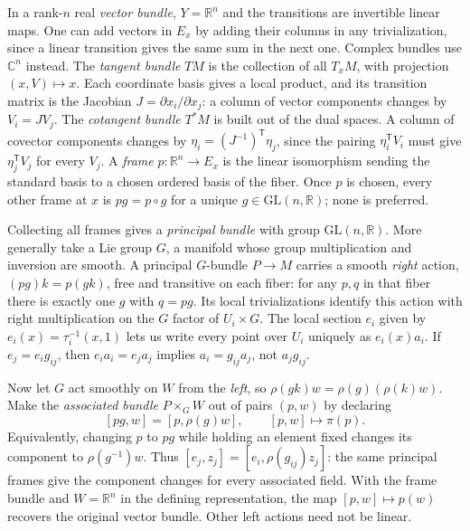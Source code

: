 In a rank-$n$ real \emph{vector bundle}, $Y=\mathbb R^n$ and the transitions are invertible linear maps. One can add vectors in $E_x$ by adding their columns in any trivialization, since a linear transition gives the same sum in the next one. Complex bundles use $\mathbb C^n$ instead. The \emph{tangent bundle} $TM$ is the collection of all $T_xM$, with projection $(x,V)\mapsto x$. Each coordinate basis gives a local product, and its transition matrix is the Jacobian $J=\partial x_i/\partial x_j$: a column of vector components changes by $V_i=J V_j$. The \emph{cotangent bundle} $T^*M$ is built out of the dual spaces. A column of covector components changes by $\eta_i=(J^{-1})^{\mathsf T}\eta_j$, since the pairing $\eta_i^{\mathsf T}V_i$ must give $\eta_j^{\mathsf T}V_j$ for every $V_j$. A \emph{frame} $p:\mathbb R^n\to E_x$ is the linear isomorphism sending the standard basis to a chosen ordered basis of the fiber. Once $p$ is chosen, every other frame at $x$ is $p g=p\circ g$ for a unique $g\in\mathrm{GL}(n,\mathbb R)$; none is preferred.

Collecting all frames gives a \emph{principal bundle} with group $\mathrm{GL}(n,\mathbb R)$. More generally take a Lie group $G$, a manifold whose group multiplication and inversion are smooth. A principal $G$-bundle $P\to M$ carries a smooth \emph{right} action, $(p g)k=p(gk)$, free and transitive on each fiber: for any $p,q$ in that fiber there is exactly one $g$ with $q=p g$. Its local trivializations identify this action with right multiplication on the $G$ factor of $U_i\times G$. The local section $e_i$ given by $e_i(x)=\tau_i^{-1}(x,1)$ lets us write every point over $U_i$ uniquely as $e_i(x)a_i$. If $e_j=e_i g_{ij}$, then $e_i a_i=e_j a_j$ implies $a_i=g_{ij}a_j$, not $a_j g_{ij}$.

Now let $G$ act smoothly on $W$ from the \emph{left}, so $\rho(gk)w=\rho(g)(\rho(k)w)$. Make the \emph{associated bundle} $P\times_G W$ out of pairs $(p,w)$ by declaring
\[
 [p g,w]=[p,\rho(g)w],\qquad [p,w]\longmapsto\pi(p) .
\]
Equivalently, changing $p$ to $p g$ while holding an element fixed changes its component to $\rho(g^{-1})w$. Thus $[e_j,z_j]=[e_i,\rho(g_{ij})z_j]$: the same principal frames give the component changes for every associated field. With the frame bundle and $W=\mathbb R^n$ in the defining representation, the map $[p,w]\mapsto p(w)$ recovers the original vector bundle. Other left actions need not be linear.

